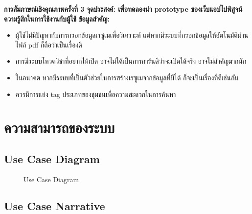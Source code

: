 \noindent\textbf{การสัมภาษณ์เชิงคุณภาพครั้งที่ 3}
\newline
\textbf{จุดประสงค์: เพื่อทดลองนำ prototype ของเว็บแอปไปพิสูจน์ความรู้สึกในการใช้งานกับผู้ใช้}
\newline
\textbf{ข้อมูลสำคัญ:}
\begin{itemize}
    \item ผู้ใช้ไม่มีปัญหากับการกรอกข้อมูลเรซูเมเพื่อวิเคราะห์ แต่หากมีระบบที่กรอกข้อมูลให้อัตโนมัติผ่านไฟล์ pdf ก็ถือว่าเป็นเรื่องดี
    \item การมีระบบโหวตวิชาที่อยากให้เปิด อาจไม่ได้เป็นการการันตีว่าจะเปิดได้จริง อาจไม่สำคัญมากนัก
    \item ในอนาคต หากมีระบบที่เป็นตัวช่วยในการสร้างเรซูเมจากข้อมูลที่มีได้ ก็จะเป็นเรื่องที่ดีเช่นกัน
    \item ควรมีการแย่ง tag ประเภทของชุมชนเพื่อความสะดวกในการค้นหา
\end{itemize}

\section{ความสามารถของระบบ}
\subsection{Use Case Diagram}
\begin{figure}[H]\centering
    \setlength{\fboxrule}{0.2mm} %
    \setlength{\fboxsep}{0.5cm}
    \caption{Use Case Diagram}\label{fig:usecase}
\end{figure}
\subsection{Use Case Narrative}
